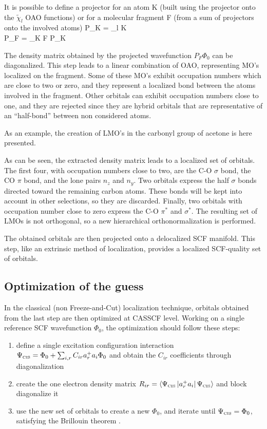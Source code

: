It is possible to define a projector for an atom K (built using the projector onto
the $\tilde{\chi}_{l}$ OAO functions) or for a molecular fragment F (from a sum of projectors
onto the involved atoms)
\beqa
P_{K} = \sum_{l \in K}   \\
P_{F} = \sum_{K \in F} P_{K}
\eeqa

The density matrix obtained by the projected wavefunction $P_{F}
\Phi_{0}$ can be diagonalized. This step leads to a linear combination of
OAO, representing MO's localized on the fragment. Some of these MO's
exhibit occupation numbers which are close to two or zero, and they
represent a localized bond between the atoms involved in the fragment. Other
orbitals can exhibit occupation numbers close to one, and they are rejected
since they are hybrid orbitals that are representative of an ``half-bond''
between non considered atoms.

As an example, the creation of LMO's in the carbonyl group of acetone is
here presented.

{\small

}

As can be seen, the extracted density matrix leads to a localized set of
orbitals. The first four, with occupation numbers close to two, are the
C-O $\sigma$ bond, the CO $\pi$ bond, and the lone pairs $n_z$ and $n_y$.
Two orbitals express the half $\sigma$ bonds directed toward the remaining
carbon atoms. These bonds will be kept into account in other selections, so
they are discarded. Finally, two orbitals with occupation number close to
zero express the C-O $\pi^{*}$ and $\sigma^{*}$.  The resulting set of LMOs
is not orthogonal, so a new hierarchical orthonormalization is performed.

The obtained orbitals are then projected onto a delocalized SCF manifold.
This step, like an extrinsic method of localization, provides a localized
SCF-quality set of orbitals.

\subsection*{Optimization of the guess}

In the classical (non Freeze-and-Cut) localization technique, orbitals
obtained from the last step are then optimized at CASSCF level.  Working on
a single reference SCF wavefunction $\Phi_{0}$, the optimization
should follow these steps:
\begin{enumerate}
\item define a single excitation configuration interaction
$\Psi_{\mbox{\tiny CIS}} = \Phi_{0} + \sum_{i,r} C_{ir} a_{r}^{+} a_i \Phi_{0}$
and obtain the $C_{ir}$ coefficients through diagonalization
\item create the one electron density matrix $R_{ir} =
\left\langle \Psi_{\mbox{\tiny CIS}} \left| a_{r}^{+} a_i \right| \Psi_{\mbox{\tiny CIS}} \right\rangle$ and
block diagonalize it
\item use the new set of orbitals to create a new $\Phi_{0}$, and iterate until
$\Psi_{\mbox{\tiny CIS}} = \Phi_{0}$, satisfying the Brillouin theorem \cite{asi-159-1934}.
\end{enumerate}

